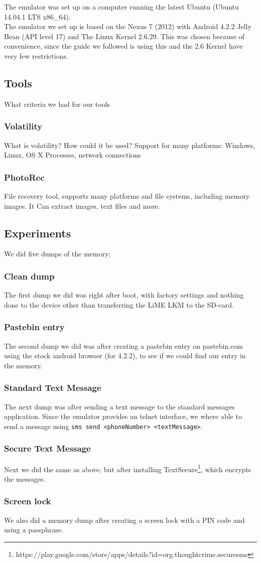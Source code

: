 The emulator was set up on a computer running the latest Ubuntu (Ubuntu 14.04.1 LTS x86\_64).\\
The emulator we set up is based on the Nexus 7 (2012) with Android 4.2.2 Jelly Bean (API level 17) and The Linux Kernel 2.6.29. 
This was chosen because of convenience, since the guide we followed is using this and the 2.6 Kernel have very few restrictions.
\subsection{Tools}
What criteria we had for our tools
  \subsubsection{Volatility} %
  What is volatility? How could it be used?
  Support for many platforms: Windows, Linux, OS X
  Processes, network connections
  \subsubsection{PhotoRec}
  File recovery tool, supports many platforms and file systems, including memory images. 
  It Can extract images, text files and more.
\subsection{Experiments}
We did five dumps of the memory;
  \subsubsection{Clean dump}
  The first dump we did was right after boot, with factory settings and nothing done to the device 
  other than transferring the LiME LKM to the SD-card.
  \subsubsection{Pastebin entry}
  The second dump we did was after creating a pastebin entry on pastebin.com using the stock android browser (for 4.2.2),
  to see if we could find our entry in the memory.
  \subsubsection{Standard Text Message}
  The next dump was after sending a text message to the standard messages application. Since the emulator provides an telnet 
  interface, we where able to send a message using \texttt{sms send <phoneNumber> <textMessage>}.
  \subsubsection{Secure Text Message}
  Next we did the same as above, but after installing 
  TextSecure\footnote{https://play.google.com/store/apps/details?id=org.thoughtcrime.securesms}, which encrypts the messages. 
  \subsubsection{Screen lock}
  We also did a memory dump after creating a screen lock with a PIN code and using a passphrase.
